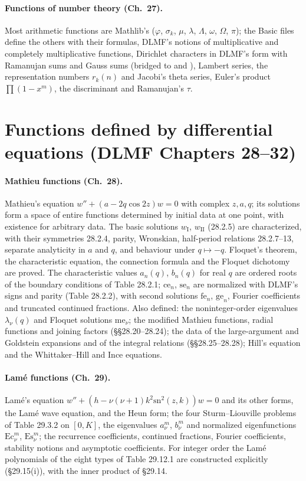 \documentclass[11pt,a4paper]{article}
\begin{document}
\paragraph{Functions of number theory (Ch.~27).} Most arithmetic functions are Mathlib's
($\varphi$, $\sigma_k$, $\mu$, $\lambda$, $\Lambda$, $\omega$, $\Omega$, $\pi$); the Basic files
define the others with their formulas, DLMF's notions of multiplicative and completely
multiplicative functions, Dirichlet characters in DLMF's form with Ramanujan sums and Gauss sums
(bridged to  and ), Lambert series, the representation
numbers $r_k(n)$ and Jacobi's theta series, Euler's product $\prod(1-x^m)$, the discriminant and
Ramanujan's $\tau$.

\section{Functions defined by differential equations (DLMF Chapters 28--32)}

\paragraph{Mathieu functions (Ch.~28).} Mathieu's equation $w''+(a-2q\cos2z)w=0$ with complex
$z,a,q$; its solutions form a space of entire functions determined by initial data at one point,
with existence for arbitrary data. The basic solutions $w_{\mathrm I}$, $w_{\mathrm{II}}$ (28.2.5)
are characterized, with their symmetries 28.2.4, parity, Wronskian, half-period relations
28.2.7--13, separate analyticity in $a$ and $q$, and behaviour under $q\mapsto-q$. Floquet's theorem,
the characteristic equation, the connection formula and the Floquet dichotomy are proved. The
characteristic values $a_n(q)$, $b_n(q)$ for real $q$ are ordered roots of the boundary conditions
of Table 28.2.1; $\mathrm{ce}_n$, $\mathrm{se}_n$ are normalized with DLMF's signs and parity
(Table 28.2.2), with second solutions $\mathrm{fe}_n$, $\mathrm{ge}_n$, Fourier coefficients and
truncated continued fractions. Also defined: the noninteger-order eigenvalues $\lambda_\nu(q)$ and
Floquet solutions $\mathrm{me}_\nu$; the modified Mathieu functions, radial functions and joining
factors (\S\S28.20--28.24); the data of the large-argument and Goldstein expansions and of the
integral relations (\S\S28.25--28.28); Hill's equation and the Whittaker--Hill and Ince equations.

\paragraph{Lam\'e functions (Ch.~29).} Lam\'e's equation
$w''+(h-\nu(\nu+1)k^2\mathrm{sn}^2(z,k))w=0$ and its other forms, the Lam\'e wave equation, and
the Heun form; the four Sturm--Liouville problems of Table 29.3.2 on $[0,K]$, the eigenvalues
$a^m_\nu$, $b^m_\nu$ and normalized eigenfunctions $\mathrm{Ec}^m_\nu$, $\mathrm{Es}^m_\nu$; the
recurrence coefficients, continued fractions, Fourier coefficients, stability notions and
asymptotic coefficients. For integer order the Lam\'e polynomials of the eight types of Table 29.12.1
are constructed explicitly (\S29.15(i)), with the inner product of \S29.14.
\end{document}
